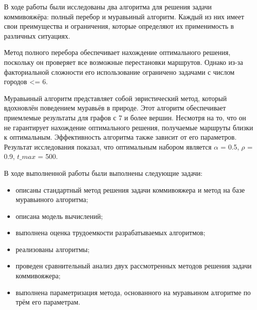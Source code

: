 
В ходе работы были исследованы два алгоритма для решения задачи коммивояжёра:
полный перебор и муравьиный алгоритм. Каждый из них имеет свои преимущества и
ограничения, которые определяют их применимость в различных ситуациях.

Метод полного перебора обеспечивает нахождение оптимального решения,
поскольку он проверяет все возможные перестановки маршрутов.
Однако из-за факториальной сложности его использование ограничено задачами с
числом городов <= 6.

Муравьиный алгоритм представляет собой эвристический метод,
который вдохновлён поведением муравьёв в природе. Этот алгоритм обеспечивает
приемлемые результаты для графов с 7 и более вершин. Несмотря на то, что он не гарантирует
нахождение оптимального решения, получаемые маршруты близки к оптимальным. Эффективность
алгоритма также зависит от его параметров. Результат исследования показал, что оптимальным
набором является $\alpha$ = 0.5, $\rho$ = 0.9, $t\_{max}$ = 500.

В ходе выполненной работы были выполнены следующие задачи:
\begin{itemize}
    \item[---] описаны стандартный метод решения задачи коммивояжера и метод на базе муравьиного алгоритма;
	\item[---] описана модель вычислений;
    \item[---] выполнена оценка трудоемкости разрабатываемых алгоритмов;
    \item[---] реализованы алгоритмы;
    \item[---] проведен сравнительный анализ двух рассмотренных методов решения задачи коммивояжера;
    \item[---] выполнена параметризация метода, основанного на муравьином алгоритме по трём его параметрам.
\end{itemize}